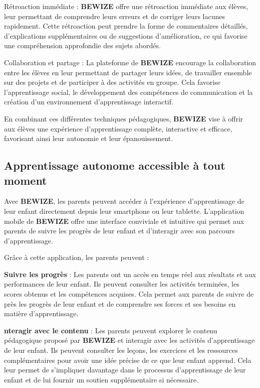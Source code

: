 Rétroaction immédiate : \textbf{BEWIZE} offre une rétroaction immédiate aux élèves, leur permettant de comprendre leurs erreurs et de corriger leurs lacunes rapidement. Cette rétroaction peut prendre la forme de commentaires détaillés, d'explications supplémentaires ou de suggestions d'amélioration, ce qui favorise une compréhension approfondie des sujets abordés.

Collaboration et partage : La plateforme de \textbf{BEWIZE} encourage la collaboration entre les élèves en leur permettant de partager leurs idées, de travailler ensemble sur des projets et de participer à des activités en groupe. Cela favorise l'apprentissage social, le développement des compétences de communication et la création d'un environnement d'apprentissage interactif.

En combinant ces différentes techniques pédagogiques, \textbf{BEWIZE} vise à offrir aux élèves une expérience d'apprentissage complète, interactive et efficace, favorisant ainsi leur autonomie et leur épanouissement.

\subsection{Apprentissage autonome accessible à tout moment}
Avec \textbf{BEWIZE}, les parents peuvent accéder à l'expérience d'apprentissage de leur enfant directement depuis leur smartphone ou leur tablette. L'application mobile de \textbf{BEWIZE} offre une interface conviviale et intuitive qui permet aux parents de suivre les progrès de leur enfant et d'interagir avec son parcours d'apprentissage.

Grâce à cette application, les parents peuvent :

\textbf{Suivre les progrès }: Les parents ont un accès en temps réel aux résultats et aux performances de leur enfant. Ils peuvent consulter les activités terminées, les scores obtenus et les compétences acquises. Cela permet aux parents de suivre de près les progrès de leur enfant et de comprendre ses forces et ses besoins en matière d'apprentissage.

\textbf{nteragir avec le contenu} : Les parents peuvent explorer le contenu pédagogique proposé par \textbf{BEWIZE} et interagir avec les activités d'apprentissage de leur enfant. Ils peuvent consulter les leçons, les exercices et les ressources complémentaires pour avoir une idée précise de ce que leur enfant apprend. Cela leur permet de s'impliquer davantage dans le processus d'apprentissage de leur enfant et de lui fournir un soutien supplémentaire si nécessaire.

